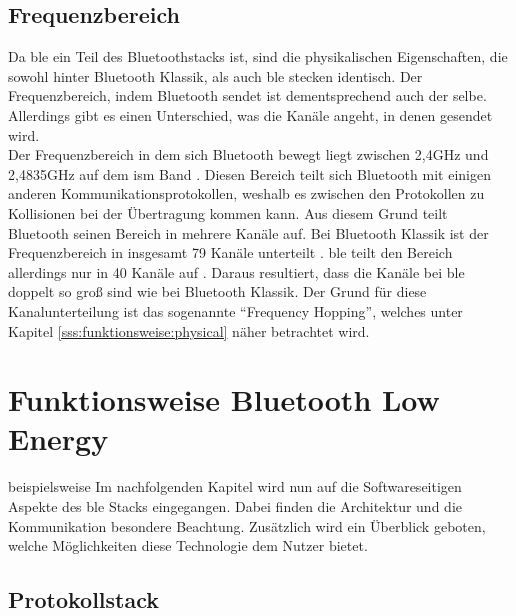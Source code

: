 \subsection{Frequenzbereich}
\label{ss:grundlagen:frequenz}

Da \ac{ble} ein Teil des Bluetoothstacks ist, sind die physikalischen Eigenschaften, die sowohl hinter Bluetooth Klassik, als auch \ac{ble} stecken identisch. Der Frequenzbereich, indem Bluetooth sendet ist dementsprechend auch der selbe. Allerdings gibt es einen Unterschied, was die Kanäle angeht, in denen gesendet wird.\\

\noindent Der Frequenzbereich in dem sich Bluetooth bewegt liegt zwischen 2,4GHz und 2,4835GHz auf dem \ac{ism} Band \cite[Seite 16]{Townsend14:GSB}. Diesen Bereich teilt sich Bluetooth mit einigen anderen Kommunikationsprotokollen, weshalb es zwischen den Protokollen zu Kollisionen bei der Übertragung kommen kann. Aus diesem Grund teilt Bluetooth seinen Bereich in mehrere Kanäle auf. Bei Bluetooth Klassik ist der Frequenzbereich in insgesamt 79 Kanäle unterteilt \cite[Seite 410]{Sauter18:GMK}. \ac{ble} teilt den Bereich allerdings nur in 40 Kanäle auf \cite[Seite 16]{Townsend14:GSB}. Daraus resultiert, dass die Kanäle bei \ac{ble} doppelt so groß sind wie bei Bluetooth Klassik. Der Grund für diese Kanalunterteilung ist das sogenannte "`Frequency Hopping"', welches unter Kapitel \ref{sss:funktionsweise:physical} näher betrachtet wird.\\  

\section{Funktionsweise Bluetooth Low Energy}
\label{s:funktionsweise}
beispielsweise
Im nachfolgenden Kapitel wird nun auf die Softwareseitigen Aspekte des \ac{ble} Stacks eingegangen. Dabei finden die Architektur und die Kommunikation besondere Beachtung. Zusätzlich wird ein Überblick geboten, welche Möglichkeiten diese Technologie dem Nutzer bietet.\\  

\subsection{Protokollstack}
\label{ss:funktionsweise:protokollstack}

